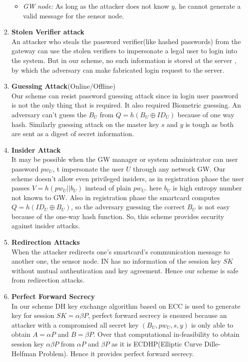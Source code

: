 \documentclass[a4paper,12pt]{report}
\begin{document}
\begin{enumerate}
\begin{itemize}
\item \textit{GW node:} As long as the attacker does not know $y$, he cannot generate a valid message for the sensor node.
\end{itemize}
\smallskip
\item \textbf{Stolen Verifier attack}\\An attacker who steals the password verifier(like hashed passwords) from the gateway can use the stolen verifiers to impersonate a legal user to login into the system. But in our scheme, no such information is stored at the server , by which the adversary can make fabricated login request to the server.\\
\item \textbf{Guessing Attack}(Online/Offline)\\Our scheme can resist password guessing attack since in login user password is not the only thing that is required. It also required Biometric guessing. An adversary can't guess the $B_U$ from $Q=h(B_{U} \oplus ID_{U})$ because of one way hash. Similarly guessing attack on the master key $s$ and $y$ is tough as both are sent as a digest of secret information.\\
\smallskip
\item \textbf{Insider Attack}\\
It may be possible when the GW manager or system administrator can user password $pw_{U}$, t impersonate the user $U$ through any network GW. Our scheme doesn't allow even privileged insiders, as in registration phase the user passes $V=h(pw_{U}||b_{U})$ instead of plain $pw_{U}$. here $b_{U}$ is high entropy number not known to GW. Also in registration phase the smartcard computes $Q=h(ID_{U} \oplus B_{U})$, so the adversary guessing the correct $B_{U}$ is not easy because of the one-way hash function. So, this scheme provides security against insider attacks.\\
\smallskip
\item \textbf{Redirection Attacks}\\
When the attacker redirects one's smartcard's communication message to another one, the sensor node. IN has no information of the session key $SK$ without mutual authentication and key agreement. Hence our scheme is safe from redirection attacks.\\
\smallskip
\item \textbf{Perfect Forward Secrecy}\\
In our scheme DH key exchange algorithm based on ECC is used to generate key for session $SK=\alpha\beta P$, perfect forward secrecy is ensured because an attacker with a compromised all secret key $(B_{U}, pw_{U}, s, y)$ is only able to obtain $A= \alpha P$ and $B= \beta P$. Over that computational in-feasibility to obtain session key $\alpha\beta P$ from $\alpha P$ and $\beta P$ as it is ECDHP(Elliptic Curve Dille-Helfman Problem). Hence it provides perfect forward secrecy.\\


\end{enumerate}
\end{document}
